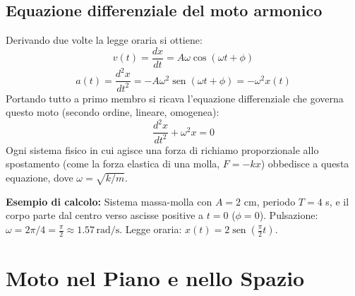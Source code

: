 \documentclass[12pt]{article}
\begin{document}
\subsection*{Equazione differenziale del moto armonico}
Derivando due volte la legge oraria si ottiene:
\begin{equation*}
v(t) = \frac{dx}{dt} = A\omega \cos(\omega t + \phi)
\end{equation*}
\begin{equation*}
a(t) = \frac{d^2x}{dt^2} = -A\omega^2 \operatorname{sen}(\omega t + \phi) = -\omega^2 x(t)
\end{equation*}
Portando tutto a primo membro si ricava l'equazione differenziale che governa questo moto (secondo ordine, lineare, omogenea): %
\begin{equation}
\frac{d^2x}{dt^2} + \omega^2x = 0 \tag{1.15}
\end{equation}
Ogni sistema fisico in cui agisce una forza di richiamo proporzionale allo spostamento (come la forza elastica di una molla, $F = -kx$) obbedisce a questa equazione, dove $\omega = \sqrt{k/m}$.

\textbf{Esempio di calcolo:} Sistema massa-molla con $A=2$ cm, periodo $T=4$ s, e il corpo parte dal centro verso ascisse positive a $t=0$ ($\phi=0$).
Pulsazione: $\omega = 2\pi / 4 = \frac{\pi}{2} \approx 1.57 \, \text{rad/s}$. Legge oraria: $x(t) = 2 \operatorname{sen}\left(\frac{\pi}{2}t\right)$.

\begin{center}
\end{center}

\newpage
\section*{Moto nel Piano e nello Spazio}
\end{document}

